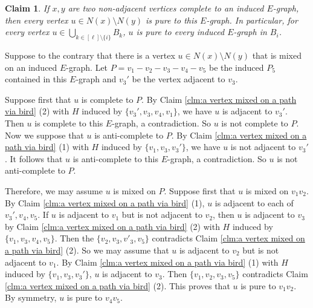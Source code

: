 \documentclass[a4paper,11pt]{article}
\newtheorem{claim}{Claim}[theorem]
\let\oldendproof\endproof
\renewenvironment{proof}[1][\proofname]{%
	\oldproof[\normalfont\bfseries #1]%
}{\oldendproof}
\renewcommand{\qedsymbol}{$\square$}%
\newenvironment{subproof}[1][\normalfont\it Subproof]{%
	\renewcommand{\qedsymbol}{{\tiny{$\blacksquare$}}}%
	\begin{proof}[#1]%
	}{%
	\end{proof}%
}
\begin{document}
\begin{proof}
        \begin{claim}\label{clm:homo structure}
            If $x,y$ are two non-adjacent vertices complete to an induced $E$-graph,
            then every vertex $u\in N(x)\setminus N(y)$ is pure to this $E$-graph. 
            In particular, for every vertex $u\in \bigcup_{k\in [\ell]\setminus \{i\}} B_k$, $u$ is pure to every induced $E$-graph in $B_i$. 
        \end{claim}
        \begin{subproof}[Proof of Claim \ref{clm:homo structure}]
            Suppose to the contrary that there is a vertex $u\in N(x)\setminus N(y)$ that is mixed on an induced $E$-graph. 
            Let $P=v_1-v_2-v_3-v_4-v_5$ be the induced $P_5$ contained in this $E$-graph and $v_3'$ be the vertex adjacent to $v_3$. 
            
            Suppose first that $u$ is complete to $P$.  
            By Claim \ref{clm:a vertex mixed on a path via bird} (2) with $H$ induced by $\{v_3',v_3,v_4,v_1\}$, we have $u$ is adjacent to $v_3'$.   
            Then $u$ is complete to this $E$-graph, a contradiction. 
            So $u$ is not complete to $P$. 
            Now we suppose that $u$ is anti-complete to $P$. 
            By Claim \ref{clm:a vertex mixed on a path via bird} (1) with $H$ induced by $\{v_1,v_3,v_3'\}$, we have $u$ is not adjacent to $v_3'$. 
            It follows that $u$ is anti-complete to this $E$-graph, a contradiction. 
            So $u$ is not anti-complete to $P$. 

            Therefore, we may assume $u$ is mixed on $P$.
            Suppose first that $u$ is mixed on $v_1v_2$. 
            By Claim \ref{clm:a vertex mixed on a path via bird} (1), $u$ is adjacent to each of $v_3',v_4,v_5$.
            If $u$ is adjacent to $v_1$ but is not adjacent to $v_2$, then $u$ is adjacent to $v_3$
            by Claim \ref{clm:a vertex mixed on a path via bird} (2) with $H$ induced by $\{v_1,v_3,v_4,v_5\}$.
            Then the $\{v_2,v_3,v'_3,v_5\}$ contradicts 
            Claim \ref{clm:a vertex mixed on a path via bird} (2).
            So we may assume that $u$ is adjacent to $v_2$ but is not adjacent to $v_1$. 
            By Claim \ref{clm:a vertex mixed on a path via bird} (1) with $H$ induced by $\{v_1,v_3,v_3'\}$, $u$ is adjacent to $v_3$. Then $\{v_1,v_2,v_3,v_5\}$ contradicts Claim \ref{clm:a vertex mixed on a path via bird} (2).
            This proves that $u$ is pure to $v_1v_2$.
            By symmetry, $u$ is pure to $v_4v_5$. 


\end{subproof}
\end{proof}
\end{document}
